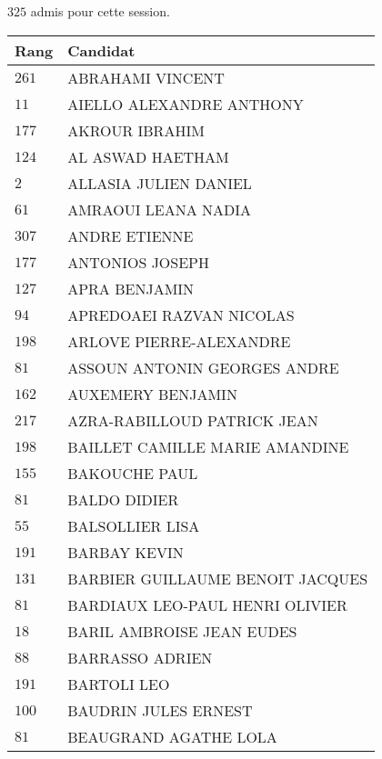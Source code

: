 



  $325$ admis pour cette session.

  \begin{xltabular}{\linewidth}{|l|X|}
    \hline
    \textbf{Rang} & \textbf{Candidat} \\
    \hline
    $261$ & ABRAHAMI VINCENT \\
    \hline
    $11$ & AIELLO ALEXANDRE ANTHONY \\
    \hline
    $177$ & AKROUR IBRAHIM \\
    \hline
    $124$ & AL ASWAD HAETHAM \\
    \hline
    $2$ & ALLASIA JULIEN DANIEL \\
    \hline
    $61$ & AMRAOUI LEANA NADIA \\
    \hline
    $307$ & ANDRE ETIENNE \\
    \hline
    $177$ & ANTONIOS JOSEPH \\
    \hline
    $127$ & APRA BENJAMIN \\
    \hline
    $94$ & APREDOAEI RAZVAN NICOLAS \\
    \hline
    $198$ & ARLOVE PIERRE-ALEXANDRE \\
    \hline
    $81$ & ASSOUN ANTONIN GEORGES ANDRE \\
    \hline
    $162$ & AUXEMERY BENJAMIN \\
    \hline
    $217$ & AZRA-RABILLOUD PATRICK JEAN \\
    \hline
    $198$ & BAILLET CAMILLE MARIE AMANDINE \\
    \hline
    $155$ & BAKOUCHE PAUL \\
    \hline
    $81$ & BALDO DIDIER \\
    \hline
    $55$ & BALSOLLIER LISA \\
    \hline
    $191$ & BARBAY KEVIN \\
    \hline
    $131$ & BARBIER GUILLAUME BENOIT JACQUES \\
    \hline
    $81$ & BARDIAUX LEO-PAUL HENRI OLIVIER \\
    \hline
    $18$ & BARIL AMBROISE JEAN EUDES \\
    \hline
    $88$ & BARRASSO ADRIEN \\
    \hline
    $191$ & BARTOLI LEO \\
    \hline
    $100$ & BAUDRIN JULES ERNEST \\
    \hline
    $81$ & BEAUGRAND AGATHE LOLA \\

\end{xltabular}
